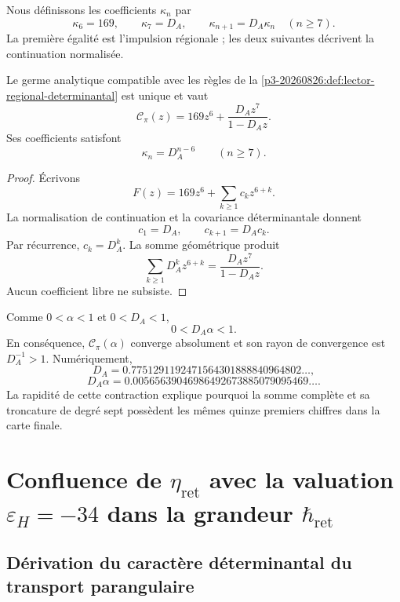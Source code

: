 
Nous définissons les coefficients \(\kappa_n\) par
\[
\kappa_6=169,
\qquad
\kappa_7=D_A,
\qquad
\kappa_{n+1}=D_A\kappa_n\quad(n\ge7).
\]
La première égalité est l'impulsion régionale ; les deux suivantes décrivent la
continuation normalisée.

\begin{theorem}
\label{p3-20260826:thm:realizacion-analitica-graduada}
Le germe analytique compatible avec les règles de la
\cref{p3-20260826:def:lector-regional-determinantal} est unique et vaut
\[
\boxed{
\mathscr C_\pi(z)
=169z^6+\frac{D_Az^7}{1-D_Az}.}
\]
Ses coefficients satisfont
\[
\kappa_n=D_A^{n-6}\qquad(n\ge7).
\]
\end{theorem}

\begin{proof}
Écrivons
\[
F(z)=169z^6+\sum_{k\ge1}c_kz^{6+k}.
\]
La normalisation de continuation et la covariance déterminantale donnent
\[
c_1=D_A,
\qquad
c_{k+1}=D_Ac_k.
\]
Par récurrence, \(c_k=D_A^k\). La somme géométrique produit
\[
\sum_{k\ge1}D_A^kz^{6+k}
=\frac{D_Az^7}{1-D_Az}.
\]
Aucun coefficient libre ne subsiste.
\end{proof}

Comme \(0<\alpha<1\) et
\(0<D_A<1\),
\[
0<D_A\alpha<1.
\]
En conséquence, \(\mathscr C_\pi(\alpha)\) converge absolument et son
rayon de convergence est \(D_A^{-1}>1\). Numériquement,
\[
D_A=0.7751291192471564301888840964802\ldots,
\]
\[
D_A\alpha=0.00565639046986492673885079095469\ldots.
\]
La rapidité de cette contraction explique pourquoi la somme complète et sa
troncature de degré sept possèdent les mêmes quinze premiers chiffres dans la
carte finale.

\section{Confluence de \texorpdfstring{\(\eta_{\mathrm{ret}}\)}{eta_ret} avec la valuation \texorpdfstring{\(\varepsilon_H=-34\)}{epsilon_H=-34} dans la grandeur \texorpdfstring{\(\hbar_{\mathrm{ret}}\)}{hbar_ret}}
\label{sec:s102:c38:3}

\subsection{Dérivation du caractère déterminantal du transport parangulaire}
\label{sec:s102:c38:3:1}

